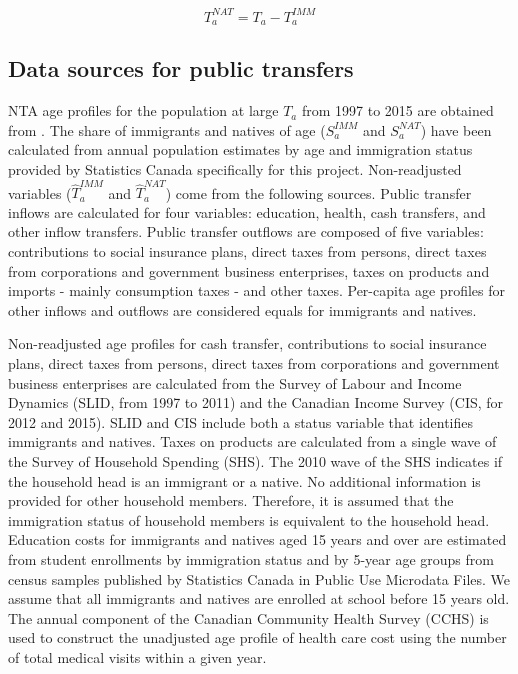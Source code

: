 \begin{equation}\label{eq:nat}
 {T}^{NAT}_a ={T}_a -{T}^{IMM}_a
\end{equation}

\subsection*{Data sources for public transfers}

NTA age profiles for the population at large \({T}_a \) from 1997 to 2015 are obtained from  \citet{Merette:2019kz}.
The share of immigrants and natives of age (\( S^{IMM}_a \) and \( S^{NAT}_a \)) have been calculated from annual population estimates by age and immigration status provided by Statistics Canada specifically for this project.
Non-readjusted variables (\(\hat{T}^{IMM}_a \) and \(\hat{T}^{NAT}_a \)) come from the following sources.
Public transfer inflows are calculated for four variables: education, health, cash transfers, and other inflow transfers.
Public transfer outflows are composed of five variables: contributions to social insurance plans, direct taxes from persons, direct taxes from corporations and government business enterprises, taxes on products and imports - mainly consumption taxes - and other taxes.
Per-capita age profiles for other inflows and outflows are considered equals for immigrants and natives.

\vspace{0.7em}\par
Non-readjusted age profiles for cash transfer, contributions to social insurance plans, direct taxes from persons, direct taxes from corporations and government business enterprises are calculated from the Survey of Labour and Income Dynamics (SLID, from 1997 to 2011) and the Canadian Income Survey (CIS, for 2012 and 2015).
SLID and CIS include both a status variable that identifies immigrants and natives.
Taxes on products are calculated from a single wave of the Survey of Household Spending (SHS).
The 2010 wave of the SHS indicates if the household head is an immigrant or a native.
No additional information is provided for other household members.
Therefore, it is assumed that the immigration status of household members is equivalent to the household head.
Education costs for immigrants and natives aged 15 years and over are estimated from student enrollments by immigration status and by 5-year age groups from census samples published by Statistics Canada in Public Use Microdata Files.
We assume that all immigrants and natives are enrolled at school before 15 years old.
The annual component of the Canadian Community Health Survey (CCHS) is used to construct the unadjusted age profile of health care cost using the number of total medical visits within a given year.

